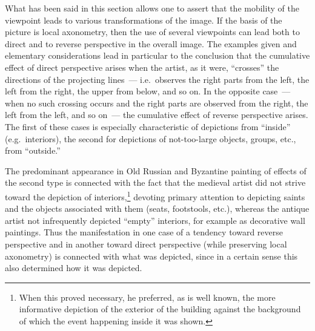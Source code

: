 
What has been said in this section allows one to assert that the mobility of the
viewpoint leads to various transformations of the image.  If the basis of the picture
is local axonometry, then the use of several viewpoints can lead both to direct and
to reverse perspective in the overall image.  The examples given and elementary
considerations lead in particular to the conclusion that the cumulative effect of
direct perspective arises when the artist, as it were, ``crosses'' the directions of
the projecting lines~--- i.e.\ observes the right parts from the left, the left from
the right, the upper from below, and so on.  In the opposite case~--- when no such
crossing occurs and the right parts are observed from the right, the left from the
left, and so on~--- the cumulative effect of reverse perspective arises.  The first of
these cases is especially characteristic of depictions from ``inside'' (e.g.\
interiors), the second for depictions of not-too-large objects, groups, etc., from
``outside.''


The predominant appearance in Old Russian and Byzantine painting of effects of the
second type is connected with the fact that the medieval artist did not strive toward
the depiction of interiors,\footnote{When this proved necessary, he preferred, as is
  well known, the more informative depiction of the exterior of the building against
  the background of which the event happening inside it was shown.}
devoting primary attention to depicting saints and the objects associated with them
(seats, footstools, etc.), whereas the antique artist not infrequently depicted
``empty'' interiors, for example as decorative wall paintings.  Thus the manifestation
in one case of a tendency toward reverse perspective and in another toward direct
perspective (while preserving local axonometry) is connected with what was depicted,
since in a certain sense this also determined how it was depicted.


